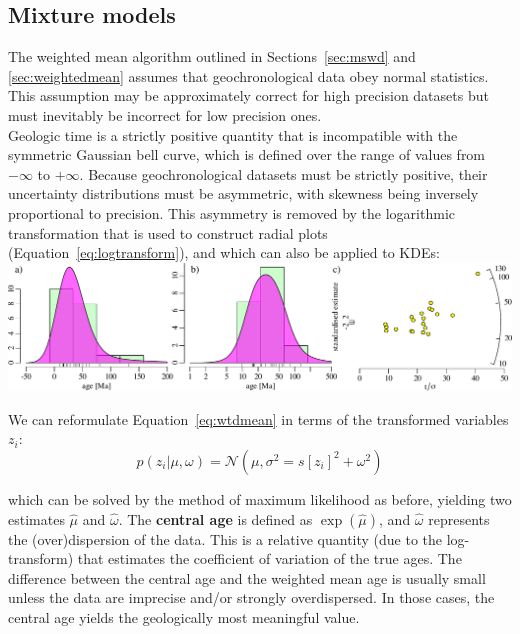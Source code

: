 \begin{refsection}
\section{Mixture models}
\label{sec:mixtures}

The weighted mean algorithm outlined in Sections~\ref{sec:mswd} and
\ref{sec:weightedmean} assumes that geochronological data obey normal
statistics. This assumption may be approximately correct for high
precision datasets but must inevitably be incorrect for low precision
ones.\\

Geologic time is a strictly positive quantity that is incompatible
with the symmetric Gaussian bell curve, which is defined over the
range of values from $-\infty$ to $+\infty$. Because geochronological
datasets must be strictly positive, their uncertainty distributions
must be asymmetric, with skewness being inversely proportional to
precision. This asymmetry is removed by the logarithmic transformation
that is used to construct radial plots
(Equation~\ref{eq:logtransform}), and which can also be applied to
KDEs:\\

\noindent\includegraphics[width=\textwidth]{../figures/logtrans.pdf}
\begingroup
{}
\endgroup

We can reformulate Equation~\ref{eq:wtdmean} in terms of the
transformed variables $z_i$:
\begin{equation}
  p(z_i|\mu,\omega) = \mathcal{N}\left( \mu, \sigma^2 =
  s[z_i]^2+\omega^2 \right)
  \label{eq:central}
\end{equation}

\noindent which can be solved by the method of maximum likelihood as
before, yielding two estimates $\hat{\mu}$ and $\hat{\omega}$. The
\textbf{central age} is defined as $\exp(\hat{\mu})$, and
$\hat{\omega}$ represents the (over)dispersion of the data.  This is a
relative quantity (due to the log-transform) that estimates the
coefficient of variation of the true ages. The difference between the
central age and the weighted mean age is usually small unless the data
are imprecise and/or strongly overdispersed. In those cases, the
central age yields the geologically most meaningful value.\\


\end{refsection}
